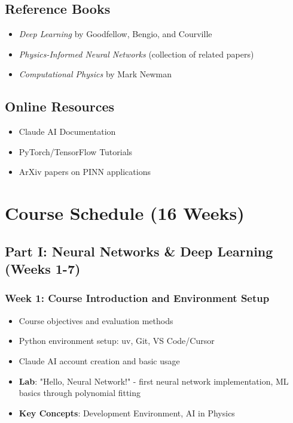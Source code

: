 \documentclass[11pt,a4paper]{article}
\begin{document}
\subsection{Reference Books}
\begin{itemize}[noitemsep]
    \item \textit{Deep Learning} by Goodfellow, Bengio, and Courville
    \item \textit{Physics-Informed Neural Networks} (collection of related papers)
    \item \textit{Computational Physics} by Mark Newman
\end{itemize}

\subsection{Online Resources}
\begin{itemize}[noitemsep]
    \item Claude AI Documentation
    \item PyTorch/TensorFlow Tutorials
    \item ArXiv papers on PINN applications
\end{itemize}

\newpage

\section{Course Schedule (16 Weeks)}

\subsection{Part I: Neural Networks \& Deep Learning (Weeks 1-7)}

\subsubsection*{Week 1: Course Introduction and Environment Setup}
\begin{itemize}[noitemsep]
    \item Course objectives and evaluation methods
    \item Python environment setup: uv, Git, VS Code/Cursor
    \item Claude AI account creation and basic usage
    \item \textbf{Lab}: "Hello, Neural Network!" - first neural network implementation, ML basics through polynomial fitting
    \item \textbf{Key Concepts}: Development Environment, AI in Physics
\end{itemize}
\end{document}
